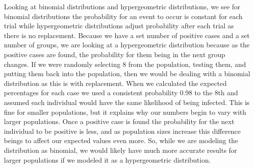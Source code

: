\documentclass{article}
\begin{document}
Looking at binomial distributions and hypergeometric distributions, we see for binomial distributions the probability for an event to occur is constant for each trial while hypergeometric distributions adjust probability after each trial as there is no replacement. Because we have a set number of positive cases and a set number of groups, we are looking at a hypergeometric distribution because as the positive cases are found, the probability for them being in the next group changes. If we were randomly selecting 8 from the population, testing them, and putting them back into the population, then we would be dealing with a binomial distribution as this is with replacement. When we calculated the expected percentages for each case we used a consistent probability 0.98 to the 8th and assumed each individual would have the same likelihood of being infected. This is fine for smaller populations, but it explains why our numbers begin to vary with larger populations. Once a positive case is found the probability for the next individual to be positive is less, and as population sizes increase this difference beings to affect our expected values even more. So, while we are modeling the distribution as binomial, we would likely have much more accurate results for larger populations if we modeled it as a hypergeometric distribution. 
\end{document}

